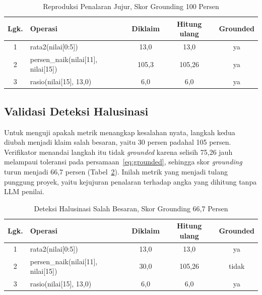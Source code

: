 \documentclass[10pt,a4paper,twocolumn]{article}
\begin{document}
\begin{table}[t]
\centering
\caption{Reproduksi Penalaran Jujur, Skor Grounding 100 Persen}
\label{tab:dbd100}
\footnotesize
\begin{tabular}{@{}cp{3.0cm}ccc@{}}
\toprule
\textbf{Lgk.} & \textbf{Operasi} & \textbf{Diklaim} & \textbf{Hitung ulang} & \textbf{Grounded} \\
\midrule
1 & rata2(nilai[0:5]) & 13,0 & 13,0 & ya \\
2 & persen\_naik(nilai[11], nilai[15]) & 105,3 & 105,26 & ya \\
3 & rasio(nilai[15], 13,0) & 6,0 & 6,0 & ya \\
\bottomrule
\end{tabular}
\end{table}

\subsection{Validasi Deteksi Halusinasi}
Untuk menguji apakah metrik menangkap kesalahan nyata, langkah kedua diubah
menjadi klaim salah besaran, yaitu 30 persen padahal 105 persen. Verifikator
menandai langkah itu tidak \textit{grounded} karena selisih 75,26 jauh
melampaui toleransi pada persamaan~\eqref{eq:grounded}, sehingga skor
\textit{grounding} turun menjadi 66,7 persen (Tabel~\ref{tab:dbd66}). Inilah
metrik yang menjadi tulang punggung proyek, yaitu kejujuran penalaran terhadap
angka yang dihitung tanpa LLM penilai.

\begin{table}[t]
\centering
\caption{Deteksi Halusinasi Salah Besaran, Skor Grounding 66,7 Persen}
\label{tab:dbd66}
\footnotesize
\begin{tabular}{@{}cp{3.0cm}ccc@{}}
\toprule
\textbf{Lgk.} & \textbf{Operasi} & \textbf{Diklaim} & \textbf{Hitung ulang} & \textbf{Grounded} \\
\midrule
1 & rata2(nilai[0:5]) & 13,0 & 13,0 & ya \\
2 & persen\_naik(nilai[11], nilai[15]) & 30,0 & 105,26 & tidak \\
3 & rasio(nilai[15], 13,0) & 6,0 & 6,0 & ya \\
\bottomrule
\end{tabular}
\end{table}
\end{document}
